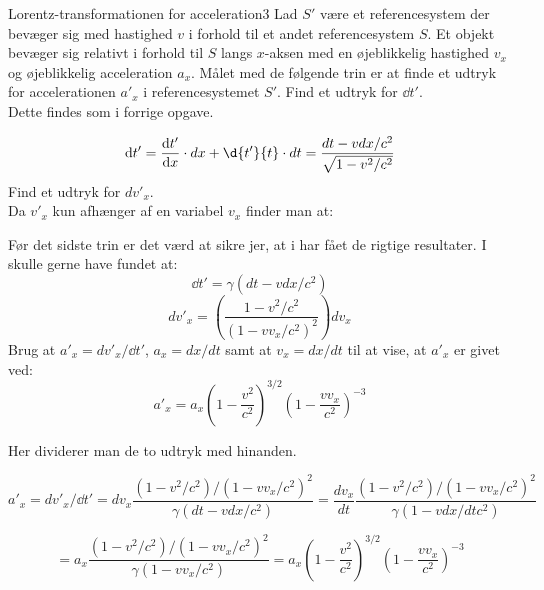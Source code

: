 \documentclass[crop=false, class=memoir]{standalone}
\begin{document}
\begin{opgave}{Lorentz-transformationen for acceleration}{3}
	Lad $S'$ være et referencesystem der bevæger sig med hastighed $v$ i forhold til et andet referencesystem $S$. Et objekt bevæger sig relativt i forhold til $S$ langs $x$-aksen med en øjeblikkelig hastighed $v_x$ og øjeblikkelig acceleration $a_x$. Målet med de følgende trin er at finde et udtryk for accelerationen $a'_x$ i referencesystemet $S'$.
	\opg Find et udtryk for $\dd{t'}$.\\
	
	Dette findes som i forrige opgave.
	
	$$\dd{t'} = \dv{t'}{x} \cdot dx + \d{t'}{t} \cdot dt = \frac{dt - v dx/c^2}{\sqrt{1- v^2 / c^2}}  $$
	\opg Find et udtryk for $dv'_x$.\\
	
	Da $v'_x$ kun afhænger af en variabel $v_x$ finder man at:
	
	Før det sidste trin er det værd at sikre jer, at i har fået de rigtige resultater. I skulle gerne have fundet at:
	$$\dd{t'} = \gamma \left( dt - v dx / c^2 \right)$$
	$$dv'_x = \left( \frac{1 - v^2/c^2}{ \left( 1-vv_x/c^2 \right)^2 } \right) dv_x$$
	\opg Brug at $a'_x = dv'_x / \dd{t'}$, $a_x = dx/dt$ samt at $v_x = dx/dt$ til at vise, at $a'_x$ er givet ved:
	$$a'_x = a_x \left( 1- \frac{v^2}{c^2} \right)^{3/2}  \left( 1 - \frac{vv_x}{c^2}  \right)^{-3}$$
	
	Her dividerer man de to udtryk med hinanden.
	
	$$ a'_x = dv'_x/\dd{t'} = dv_x \frac{ (1 - v^2/c^2)/ \left( 1-vv_x/c^2 \right)^2}{\gamma \left( dt - v dx / c^2 \right)} = \frac{dv_x}{dt} \frac{ (1 - v^2/c^2)/ \left( 1-vv_x/c^2 \right)^2}{\gamma \left( 1 - v dx /dt c^2 \right)} $$
	
	$$ = a_x \frac{ (1 - v^2/c^2)/ \left( 1-vv_x/c^2 \right)^2}{\gamma \left( 1 - v v_x/ c^2 \right)} = a_x \left( 1- \frac{v^2}{c^2} \right)^{3/2} \left( 1 - \frac{vv_x}{c^2}  \right)^{-3}  $$
\end{opgave}
\end{document}
